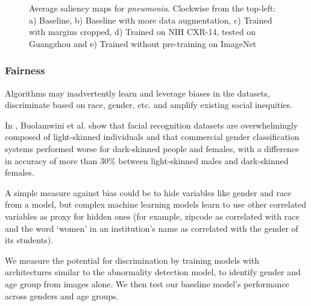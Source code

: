 \documentclass[8pt]{beamer}
\begin{document}
\begin{frame}
\begin{figure}[H]
  \caption{Average saliency maps for \emph{pneumonia}. Clockwise from the
    top-left: a) Baseline, b) Baseline with more data augmentation, c) Trained
    with margins cropped, d) Trained on NIH CXR-14, tested on Guangzhou and e)
    Trained without pre-training on ImageNet }
  \label{avg_saliency_maps}
\end{figure}
  \end{frame}

  \begin{frame}
    \frametitle{Fairness}

    Algorithms may inadvertently learn and leverage biases in the datasets,
    discriminate based on race, gender, etc. and amplify existing social
    inequities. \\ \pause

    \vspace{\baselineskip}

    In \cite{buolamwini2018gender}, Buolamwini et al. show that facial
    recognition datasets are overwhelmingly composed of light-skinned
    individuals and that commercial gender classification systems performed
    worse for dark-skinned people and females, with a difference in accuracy of
    more than 30\% between light-skinned males and dark-skinned females. \\
    \pause

    \vspace{\baselineskip}

    A simple measure against bias could be to hide variables like gender and
    race from a model, but complex machine learning models learn to use other
    correlated variables as proxy for hidden ones (for example, zipcode as
    correlated with race and the word `women' in an institution's name as
    correlated with the gender of its students\cite{dastin_2018}).

  \end{frame}

  \begin{frame}

    We measure the potential for discrimination by
    training models with architectures similar to the abnormality detection
    model, to identify gender and age group from images alone.
    We then test our baseline model's performance across genders and age groups.
  
  \end{frame}
\end{document}
